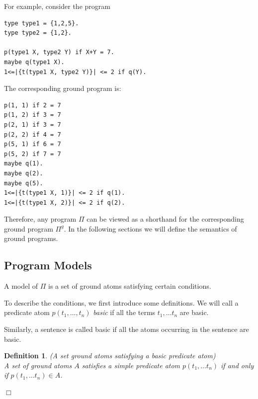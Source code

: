 \documentclass[a4paper,10pt]{article}
\newtheorem{definition}{Definition}
\begin{document}
\medskip\noindent
For example, consider the program 
\begin{verbatim}
type type1 = {1,2,5}.
type type2 = {1,2}.

p(type1 X, type2 Y) if X+Y = 7.
maybe q(type1 X).
1<=|{t(type1 X, type2 Y)}| <= 2 if q(Y).
\end{verbatim}

\medskip\noindent
The corresponding ground program is:
\begin{verbatim}
p(1, 1) if 2 = 7
p(1, 2) if 3 = 7
p(2, 1) if 3 = 7
p(2, 2) if 4 = 7
p(5, 1) if 6 = 7
p(5, 2) if 7 = 7
maybe q(1).
maybe q(2).
maybe q(5).
1<=|{t(type1 X, 1)}| <= 2 if q(1).
1<=|{t(type1 X, 2)}| <= 2 if q(2).
\end{verbatim}

\medskip\noindent
Therefore, any program $\Pi$ can be viewed as a shorthand for the corresponding ground program $\Pi^g$.
In the following sections we will define the semantics of ground programs.


\subsection{Program Models}\label{rsat}
A model of $\Pi$ is a set of ground atoms satisfying certain conditions.

To describe the conditions,  we  first introduce some definitions.
 We will call a predicate atom $p(t_1,\ldots, t_n)$ \textit{basic} if all the terms $t_1,\ldots t_n$ are basic.
 
Similarly, a sentence is called basic if all the atoms occurring in the sentence are basic.

\begin{definition}(A set ground atoms satisfying a basic predicate atom) \\
\rm{
A set of ground atoms $A$ satisfies a simple predicate atom $p(t_1,\ldots t_n)$  if and only if $p(t_1,\ldots t_n) \in A$.
}

\hfill$\Box$
\end{definition}
\end{document}
